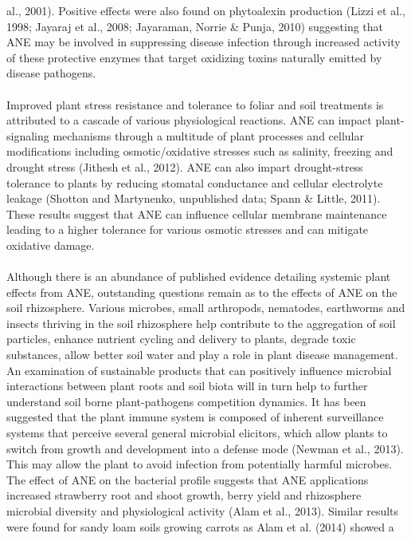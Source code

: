 \documentclass[11pt,]{article}
\begin{document}
al., 2001). Positive effects were also found on phytoalexin production
(Lizzi et al., 1998; Jayaraj et al., 2008; Jayaraman, Norrie \& Punja,
2010) suggesting that ANE may be involved in suppressing disease
infection through increased activity of these protective enzymes that
target oxidizing toxins naturally emitted by disease pathogens.\\
\hspace*{0.333em}\\
Improved plant stress resistance and tolerance to foliar and soil
treatments is attributed to a cascade of various physiological
reactions. ANE can impact plant-signaling mechanisms through a multitude
of plant processes and cellular modifications including
osmotic/oxidative stresses such as salinity, freezing and drought stress
(Jithesh et al., 2012). ANE can also impart drought-stress tolerance to
plants by reducing stomatal conductance and cellular electrolyte leakage
(Shotton and Martynenko, unpublished data; Spann \& Little, 2011). These
results suggest that ANE can influence cellular membrane maintenance
leading to a higher tolerance for various osmotic stresses and can
mitigate oxidative damage.\\
\hspace*{0.333em}\\
Although there is an abundance of published evidence detailing systemic
plant effects from ANE, outstanding questions remain as to the effects
of ANE on the soil rhizosphere. Various microbes, small arthropods,
nematodes, earthworms and insects thriving in the soil rhizosphere help
contribute to the aggregation of soil particles, enhance nutrient
cycling and delivery to plants, degrade toxic substances, allow better
soil water and play a role in plant disease management. An examination
of sustainable products that can positively influence microbial
interactions between plant roots and soil biota will in turn help to
further understand soil borne plant-pathogens competition dynamics. It
has been suggested that the plant immune system is composed of inherent
surveillance systems that perceive several general microbial elicitors,
which allow plants to switch from growth and development into a defense
mode (Newman et al., 2013). This may allow the plant to avoid infection
from potentially harmful microbes. The effect of ANE on the bacterial
profile suggests that ANE applications increased strawberry root and
shoot growth, berry yield and rhizosphere microbial diversity and
physiological activity (Alam et al., 2013). Similar results were found
for sandy loam soils growing carrots as Alam et al. (2014) showed a
\end{document}
